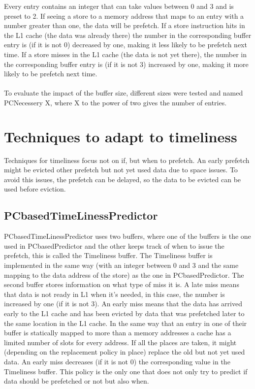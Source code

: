 Every entry contains an integer that can take values between 0 and 3 and is preset to 2. If seeing a store to a memory address that maps to an entry with a number greater than one, the data will be prefetch. If a store instruction hits in the L1 cache (the data was already there) the number in the corresponding buffer entry is (if it is not 0) decreased by one, making it less likely to be prefetch next time. If a store misses in the L1 cache (the data is not yet there), the number in the corresponding buffer entry is (if it is not 3) increased by one, making it more likely to be prefetch next time. \\ \\


To evaluate the impact of the buffer size, different sizes were tested and named PCNecessery X, where X to the power of two gives the number of entries.



\section{Techniques to adapt to timeliness} 
Techniques for timeliness focus not on if, but when to prefetch. An early prefetch might be evicted other prefetch but not yet used data due to space issues. To avoid this issues, the prefetch can be delayed, so the data to be evicted can be used before eviction. 
\subsection{PCbasedTimeLinessPredictor}

PCbasedTimeLinessPredictor uses two buffers, where one of the buffers is the one used in PCbasedPredictor and the other keeps track of when to issue the prefetch, this is called the Timeliness buffer. The Timeliness buffer is implemented in the same way (with an integer between 0 and 3 and the same mapping to the data address of the store) as the one in PCbasedPredictor. The second buffer stores information on what type of miss it is. A late miss means that data is not ready in L1 when it's needed, in this case, the number is increased by one (if it is not 3). An early miss means that the data has arrived early to the L1 cache and has been evicted by data that was prefetched later to the same location in the L1 cache. In the same way that an entry in one of their buffer is statically mapped to more than a memory addresses a cache has a limited number of slots for every address. If all the places are taken, it might (depending on the replacement policy in place) replace the old but not yet used data. An early miss decreases (if it is not 0) the corresponding value in the Timeliness buffer. This policy is the only one that does not only try to predict if data should be prefetched or not but also when.  \\ \\

